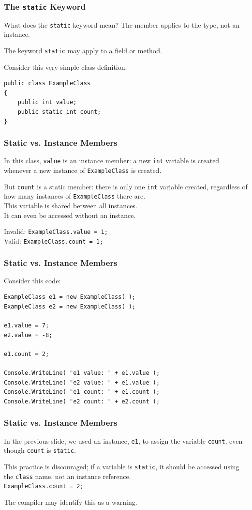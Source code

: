 \begin{frame}[fragile]
\frametitle{The \texttt{static} Keyword}
What does the \texttt{static} keyword mean? The member applies to the type, not an instance.

The keyword \texttt{static} may apply to a field or method.

Consider this very simple class definition:
\begin{verbatim}
public class ExampleClass
{
    public int value;
    public static int count;
}
\end{verbatim}

\end{frame}

\begin{frame}
\frametitle{Static vs. Instance Members}

In this class, \texttt{value} is an instance member: a new \texttt{int} variable is created whenever a new instance of \texttt{ExampleClass} is created.

But \texttt{count} is a static member: there is only one \texttt{int} variable created, regardless of how many instances of \texttt{ExampleClass} there are.\\
\quad This variable is shared between all instances.\\
\quad It can even be accessed without an instance.

Invalid: \texttt{ExampleClass.value = 1;}\\
Valid: \texttt{ExampleClass.count = 1;}

\end{frame}

\begin{frame}[fragile]
\frametitle{Static vs. Instance Members}
Consider this code:

\begin{verbatim}
ExampleClass e1 = new ExampleClass( );
ExampleClass e2 = new ExampleClass( );

e1.value = 7;
e2.value = -8;

e1.count = 2;

Console.WriteLine( "e1 value: " + e1.value );
Console.WriteLine( "e2 value: " + e1.value );
Console.WriteLine( "e1 count: " + e1.count );
Console.WriteLine( "e2 count: " + e2.count );
\end{verbatim}

\end{frame}

\begin{frame}
\frametitle{Static vs. Instance Members}
In the previous slide, we used an instance, \texttt{e1}, to assign the variable \texttt{count}, even though \texttt{count} is \texttt{static}.

This practice is discouraged; if a variable is \texttt{static}, it should be accessed using the \texttt{class} name, not an instance reference.\\
\quad \texttt{ExampleClass.count = 2;}

The compiler may identify this as a warning.

\end{frame}


